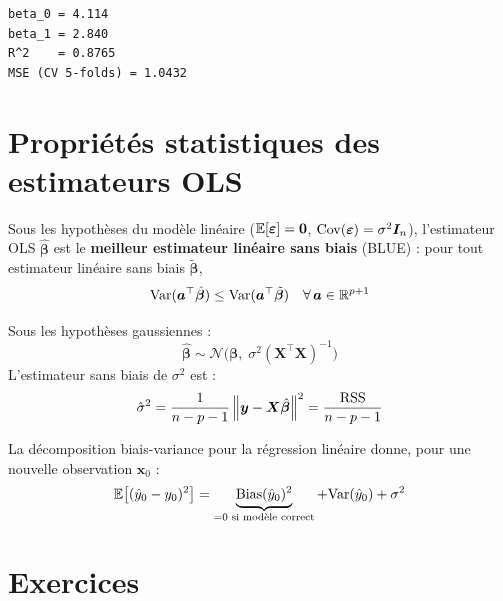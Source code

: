 \begin{codeoutput}
\begin{verbatim}
beta_0 = 4.114
beta_1 = 2.840
R^2    = 0.8765
MSE (CV 5-folds) = 1.0432
\end{verbatim}
\end{codeoutput}

\section{Propri\'et\'es statistiques des estimateurs OLS}
\label{sec:proprietes-ols}

\begin{theoreme}
Sous les hypoth\`eses du mod\`ele lin\'eaire ($\mathbb{E}[\bm{\varepsilon}] = \bm{0}$,
$\mathrm{Cov}(\bm{\varepsilon}) = \sigma^2 \bm{I}_n$), l'estimateur OLS
$\hat{\bm{\beta}}$ est le \textbf{meilleur estimateur lin\'eaire sans biais} (BLUE) :
pour tout estimateur lin\'eaire sans biais $\tilde{\bm{\beta}}$,
\[
  \mathrm{Var}(\bm{a}^\top \hat{\bm{\beta}}) \leq \mathrm{Var}(\bm{a}^\top \tilde{\bm{\beta}})
  \quad \forall\, \bm{a} \in \mathbb{R}^{p+1}
\]
\end{theoreme}

\begin{formules}[title=\textbf{Distribution des estimateurs}]
Sous les hypoth\`eses gaussiennes :
\[
  \hat{\bm{\beta}} \sim \mathcal{N}\bigl(\bm{\beta},\; \sigma^2 (\bm{X}^\top \bm{X})^{-1}\bigr)
\]
L'estimateur sans biais de $\sigma^2$ est :
\[
  \hat{\sigma}^2 = \frac{1}{n - p - 1}\left\| \bm{y} - \bm{X}\hat{\bm{\beta}} \right\|^2
  = \frac{\text{RSS}}{n - p - 1}
\]
\end{formules}

\begin{remarque}
La d\'ecomposition biais-variance pour la r\'egression lin\'eaire donne, pour une
nouvelle observation $\bm{x}_0$ :
\[
  \mathbb{E}\bigl[(\hat{y}_0 - y_0)^2\bigr]
  = \underbrace{\mathrm{Bias}(\hat{y}_0)^2}_{= 0 \text{ si mod\`ele correct}}
  + \mathrm{Var}(\hat{y}_0) + \sigma^2
\]
\end{remarque}

\section{Exercices}
\label{sec:reg-exercices}


